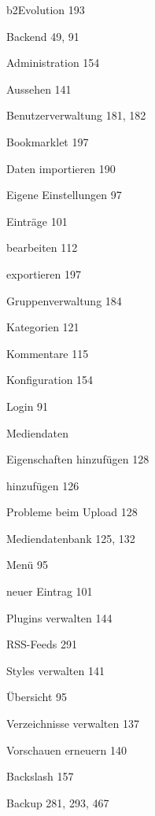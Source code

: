 \documentclass{book}
\renewcommand\subitem{\par}
\renewcommand\subsubitem{\par\hspace*{3mm}}
\begin{document}
\begin{multicols}{2}
\begin{osp-index}
  \item b2Evolution\hspace{1mm} 193
  \item Backend\hspace{1mm} 49, 91
    \subitem Administration\hspace{1mm} 154
    \subitem Aussehen\hspace{1mm} 141
    \subitem Benutzerverwaltung\hspace{1mm} 181, 182
    \subitem Bookmarklet\hspace{1mm} 197
    \subitem Daten importieren\hspace{1mm} 190
    \subitem Eigene Einstellungen\hspace{1mm} 97
    \subitem Eintr\"age\hspace{1mm} 101
      \subsubitem bearbeiten\hspace{1mm} 112
      \subsubitem exportieren\hspace{1mm} 197
    \subitem Gruppenverwaltung\hspace{1mm} 184
    \subitem Kategorien\hspace{1mm} 121
    \subitem Kommentare\hspace{1mm} 115
    \subitem Konfiguration\hspace{1mm} 154
    \subitem Login\hspace{1mm} 91
    \subitem Mediendaten
      \subsubitem Eigenschaften hinzuf\"ugen\hspace{1mm} 128
      \subsubitem hinzuf\"ugen\hspace{1mm} 126
      \subsubitem Probleme beim Upload\hspace{1mm} 128
    \subitem Mediendatenbank\hspace{1mm} 125, 132
    \subitem Men\"u\hspace{1mm} 95
    \subitem neuer Eintrag\hspace{1mm} 101
    \subitem Plugins verwalten\hspace{1mm} 144
    \subitem RSS-Feeds\hspace{1mm} 291
    \subitem Styles verwalten\hspace{1mm} 141
    \subitem \"Ubersicht\hspace{1mm} 95
    \subitem Verzeichnisse verwalten\hspace{1mm} 137
    \subitem Vorschauen erneuern\hspace{1mm} 140
  \item Backslash\hspace{1mm} 157
  \item Backup\hspace{1mm} 281, 293, 467

\end{osp-index}
\end{multicols}
\end{document}
